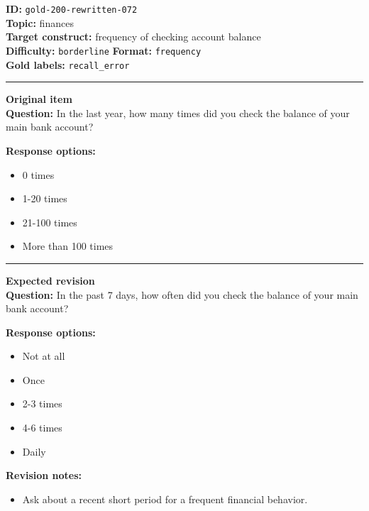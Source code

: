 \documentclass[10pt,a4paper]{article}
\newcommand{\sectionline}{\vspace{0.15em}\hrule\vspace{0.35em}}
\begin{document}
\begin{tcolorbox}[colframe=FlawRed,colback=white,colbacktitle=FlawRed!9,coltitle=black,title={Item 072\hfill Flawed item}]
\textbf{ID:} \texttt{gold-200-rewritten-072}\\
\textbf{Topic:} finances\\
\textbf{Target construct:} frequency of checking account balance\\
\textbf{Difficulty:} \texttt{borderline} \quad \textbf{Format:} \texttt{frequency}\\
\textbf{Gold labels:} \texttt{recall\_error}\\
\sectionline
\textbf{Original item}\\
\textbf{Question:} In the last year, how many times did you check the balance of your main bank account?
\par\textbf{Response options:}
\begin{itemize}
\item 0 times
\item 1-20 times
\item 21-100 times
\item More than 100 times
\end{itemize}
\sectionline
\textbf{Expected revision}\\
\textbf{Question:} In the past 7 days, how often did you check the balance of your main bank account?
\par\textbf{Response options:}
\begin{itemize}
\item Not at all
\item Once
\item 2-3 times
\item 4-6 times
\item Daily
\end{itemize}
\par\textbf{Revision notes:}
\begin{itemize}
\item Ask about a recent short period for a frequent financial behavior.
\end{itemize}
\end{tcolorbox}
\end{document}

